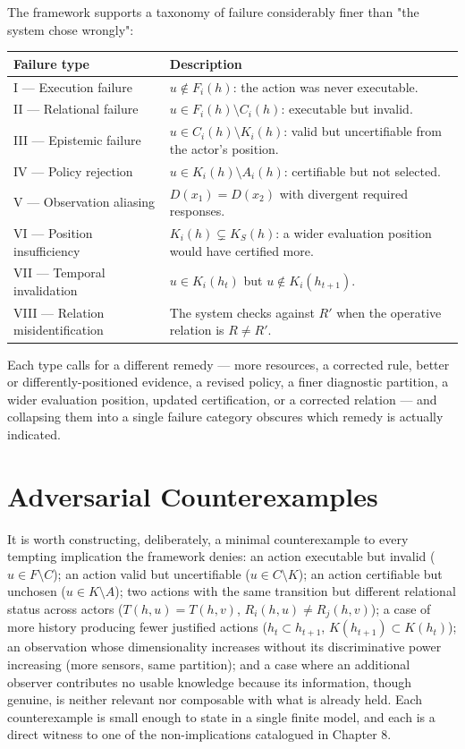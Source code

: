 \documentclass[11pt]{report}
\theoremstyle{definition}
\theoremstyle{plain}
\begin{document}
The framework supports a taxonomy of failure considerably finer than "the system chose wrongly":
\begin{center}
\begin{tabular}{@{}p{3.6cm}p{9cm}@{}}
\toprule
Failure type & Description \\
\midrule
I --- Execution failure & $u \notin F_i(h)$: the action was never executable. \\
II --- Relational failure & $u \in F_i(h) \setminus C_i(h)$: executable but invalid. \\
III --- Epistemic failure & $u \in C_i(h) \setminus K_i(h)$: valid but uncertifiable from the actor's position. \\
IV --- Policy rejection & $u \in K_i(h) \setminus A_i(h)$: certifiable but not selected. \\
V --- Observation aliasing & $D(x_1) = D(x_2)$ with divergent required responses. \\
VI --- Position insufficiency & $K_i(h) \subsetneq K_S(h)$: a wider evaluation position would have certified more. \\
VII --- Temporal invalidation & $u \in K_i(h_t)$ but $u \notin K_i(h_{t+1})$. \\
VIII --- Relation misidentification & The system checks against $R'$ when the operative relation is $R \neq R'$. \\
\bottomrule
\end{tabular}
\end{center}
Each type calls for a different remedy --- more resources, a corrected rule, better or differently-positioned evidence, a revised policy, a finer diagnostic partition, a wider evaluation position, updated certification, or a corrected relation --- and collapsing them into a single failure category obscures which remedy is actually indicated.

\chapter{Adversarial Counterexamples}

It is worth constructing, deliberately, a minimal counterexample to every tempting implication the framework denies: an action executable but invalid ($u \in F \setminus C$); an action valid but uncertifiable ($u \in C \setminus K$); an action certifiable but unchosen ($u \in K \setminus A$); two actions with the same transition but different relational status across actors ($T(h,u)=T(h,v)$, $R_i(h,u) \neq R_j(h,v)$); a case of more history producing fewer justified actions ($h_t \subset h_{t+1}$, $K(h_{t+1}) \subset K(h_t)$); an observation whose dimensionality increases without its discriminative power increasing (more sensors, same partition); and a case where an additional observer contributes no usable knowledge because its information, though genuine, is neither relevant nor composable with what is already held. Each counterexample is small enough to state in a single finite model, and each is a direct witness to one of the non-implications catalogued in Chapter 8.
\end{document}
